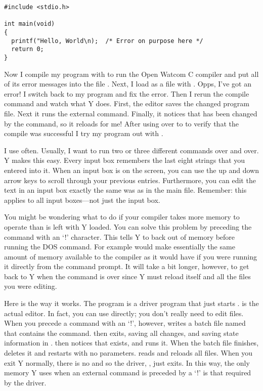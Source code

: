 \begin{verbatim}
#include <stdio.h>

int main(void)
{
  printf("Hello, World\n);  /* Error on purpose here */
  return 0;
}
\end{verbatim}

Now I compile my program with  to run the Open Watcom C
compiler and put all of its error messages into the file . Next, I load
 as a file with . Opps, I've got an error! I switch
back to my program and fix the error. Then I rerun the compile command and watch what Y does.
First, the editor saves the changed program file. Next it runs the external command. Finally, it
notices that  has been changed by the command, so it reloads
 for me! After using  over to  to verify
that the compile was successful I try my program out with .

I use  often. Usually, I want to run two or three different commands over and over. Y
makes this easy. Every input box remembers the last eight strings that you entered into it. When
an input box is on the screen, you can use the up and down arrow keys to scroll through your
previous entries. Furthermore, you can edit the text in an input box exactly the same was as in
the main file. Remember: this applies to all input boxes---not just the  input box.

You might be wondering what to do if your compiler takes more memory to operate than is left
with Y loaded. You can solve this problem by preceding the command with an `!' character. This
tells Y to back out of memory before running the DOS command. For example  would make essentially the same amount of memory available to the
compiler as it would have if you were running it directly from the command prompt. It will take
a bit longer, however, to get back to Y when the command is over since Y must reload itself and
all the files you were editing.

Here is the way it works. The program  is a driver program that just starts
.  is the actual editor. In fact, you can use
 directly; you don't really need  to edit files. When you
precede a command with an `!', however,  writes a batch file named
 that contains the command.  then exits, saving all
changes, and saving state information in .  then notices
that  exists, and runs it. When the batch file finishes, 
deletes it and restarts  with no parameters.  reads
 and reloads all files. When you exit Y normally, there is no
 and so the driver, , just exits. In this way, the only
memory Y uses when an external command is preceded by a `!' is that required by the driver.

